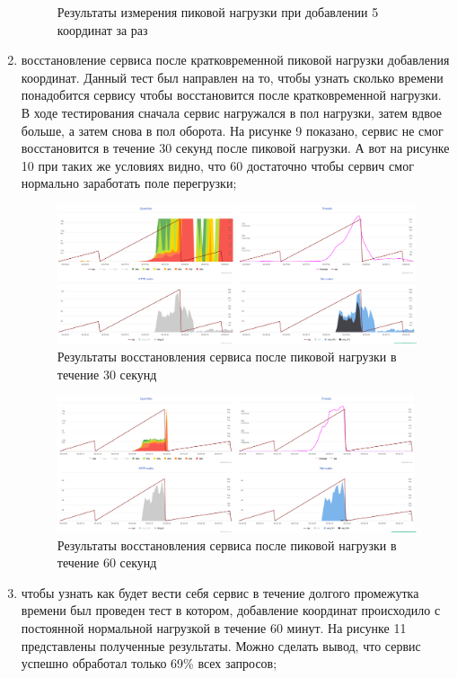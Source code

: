 \documentclass[a4paper, 10pt]{article}
\begin{document}
\begin{enumerate}
\begin{figure}[h!]
			\centering\caption{Результаты измерения пиковой нагрузки при добавлении 5 координат за раз}
		\end{figure}
		\item восстановление сервиса после кратковременной пиковой нагрузки добавления координат. Данный тест был направлен на то, чтобы узнать сколько времени понадобится сервису чтобы восстановится после кратковременной нагрузки. В ходе тестирования сначала сервис нагружался в пол нагрузки, затем вдвое больше, а затем снова в пол оборота. На рисунке 9 показано, сервис не смог восстановится в течение 30 секунд после пиковой нагрузки. А вот на рисунке 10 при таких же условиях видно, что 60 достаточно чтобы сервич смог нормально заработать поле перегрузки;
		\begin{figure}[h!]
			\centering
			\includegraphics[scale=0.4]{30s}
			\centering\caption{Результаты восстановления сервиса после пиковой нагрузки в течение 30 секунд}
		\end{figure}
		\begin{figure}[h!]
			\centering
			\includegraphics[scale=0.4]{60s}
			\centering\caption{Результаты восстановления сервиса после пиковой нагрузки в течение 60 секунд}
		\end{figure}
		\item чтобы узнать как будет вести себя сервис в течение долгого промежутка времени был проведен тест в котором, добавление координат происходило с постоянной нормальной нагрузкой в течение 60 минут. На рисунке 11 представлены полученные результаты. Можно сделать вывод, что сервис успешно обработал только 69\% всех запросов;

\end{enumerate}
\end{document}

